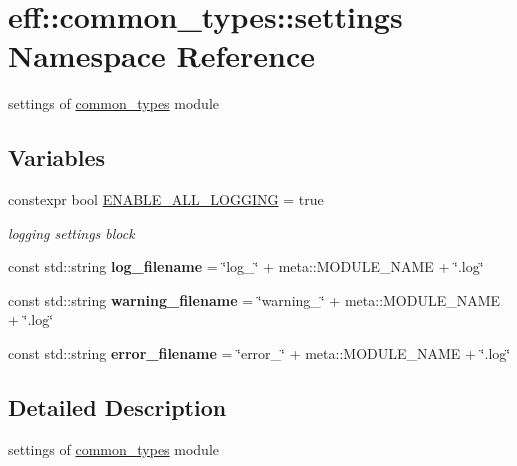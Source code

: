 \hypertarget{namespaceeff_1_1common__types_1_1settings}{}\section{eff\+:\+:common\+\_\+types\+:\+:settings Namespace Reference}
\label{namespaceeff_1_1common__types_1_1settings}


settings of \hyperlink{namespaceeff_1_1common__types}{common\+\_\+types} module  


\subsection*{Variables}
\begin{DoxyCompactItemize}
\item 
\mbox{\label{namespaceeff_1_1common__types_1_1settings_a5c5b3354a6e4055539841041a63e5673}} 
constexpr bool \hyperlink{namespaceeff_1_1common__types_1_1settings_a5c5b3354a6e4055539841041a63e5673}{E\+N\+A\+B\+L\+E\+\_\+\+A\+L\+L\+\_\+\+L\+O\+G\+G\+I\+NG} = true
\begin{DoxyCompactList}\small\item\em logging settings block \end{DoxyCompactList}\item 
\mbox{\label{namespaceeff_1_1common__types_1_1settings_a41717b1ac34550dd376f987ef237ed8a}} 
const std\+::string {\bfseries log\+\_\+filename} = \char`\"{}log\+\_\+\char`\"{} + meta\+::\+M\+O\+D\+U\+L\+E\+\_\+\+N\+A\+ME + \char`\"{}.log\char`\"{}
\item 
\mbox{\label{namespaceeff_1_1common__types_1_1settings_ad39d059331b6b985c3391ce25fd11c13}} 
const std\+::string {\bfseries warning\+\_\+filename} = \char`\"{}warning\+\_\+\char`\"{} + meta\+::\+M\+O\+D\+U\+L\+E\+\_\+\+N\+A\+ME + \char`\"{}.log\char`\"{}
\item 
\mbox{\label{namespaceeff_1_1common__types_1_1settings_aec651aecae437540becb766b5b3e313a}} 
const std\+::string {\bfseries error\+\_\+filename} = \char`\"{}error\+\_\+\char`\"{} + meta\+::\+M\+O\+D\+U\+L\+E\+\_\+\+N\+A\+ME + \char`\"{}.log\char`\"{}
\end{DoxyCompactItemize}


\subsection{Detailed Description}
settings of \hyperlink{namespaceeff_1_1common__types}{common\+\_\+types} module 